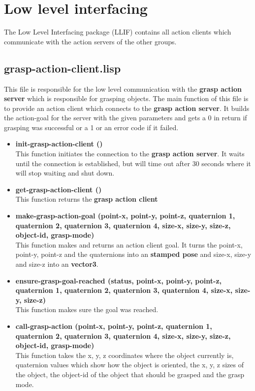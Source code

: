 \documentclass[main.tex]{subfiles}
\begin{document}
          \section{Low level interfacing}
          \label{llif}
        The Low Level Interfacing package (LLIF) contains all action clients which communicate with the action servers of the other groups.
        \subsection{grasp-action-client.lisp}
        This file is responsible for the low level communication with the \textbf{grasp action server} which is responsible for grasping objects. The main function of this file is to provide an action client which connects to the \textbf{grasp action server}. It builds the action-goal for the server with the given parameters and gets a 0 in return if grasping was successful or a 1  or an error code if it failed.
        \begin{itemize}
            \item \textbf{init-grasp-action-client ()} \\
            This function initiates the connection to the \textbf{grasp action server}. It waits until the connection is established, but will time out after 30 seconds where it will stop waiting and shut down. 
            \item \textbf{get-grasp-action-client ()} \\
            This function returns the \textbf{grasp action client}
            \item \textbf{make-grasp-action-goal (point-x, point-y, point-z, quaternion 1, quaternion 2, quaternion 3, quaternion 4, size-x, size-y, size-z, object-id, grasp-mode)} \\
            This function makes and returns an action client goal. It turns the point-x, point-y, point-z and the quaternions into an \textbf{stamped pose} and size-x, size-y and size-z into an \textbf{vector3}.
            \item \textbf{ensure-grasp-goal-reached (status, point-x, point-y, point-z, quaternion 1, quaternion 2, quaternion 3, quaternion 4, size-x, size-y, size-z)} \\
            This function makes sure the goal was reached.
            \item \textbf{call-grasp-action (point-x, point-y, point-z, quaternion 1, quaternion 2, quaternion 3, quaternion 4, size-x, size-y, size-z, object-id, grasp-mode)} \\
            This function takes the x, y, z coordinates where the object currently is, quaternion values which show how the object is oriented, the x, y, z sizes of the object, the object-id of the object that should be grasped and the grasp mode. 
        \end{itemize}
\end{document}
